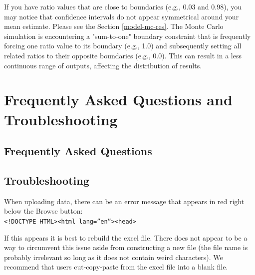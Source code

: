 \documentclass[
]{book}
\begin{document}
If you have ratio values that are close to boundaries (e.g., 0.03 and 0.98), you may notice that confidence intervals do not appear symmetrical around your mean estimate. Please see the Section \ref{model-mc-res}. The Monte Carlo simulation is encountering a "sum-to-one" boundary constraint that is frequently forcing one ratio value to its boundary (e.g., 1.0) and subsequently setting all related ratios to their opposite boundaries (e.g., 0.0). This can result in a less continuous range of outputs, affecting the distribution of results.

\hypertarget{ft}{%
\chapter{Frequently Asked Questions and Troubleshooting}\label{ft}}

\hypertarget{ft-faqs}{%
\section{Frequently Asked Questions}\label{ft-faqs}}

\hypertarget{ft-trbl}{%
\section{Troubleshooting}\label{ft-trbl}}

When uploading data, there can be an error message that appears in red right below the Browse button:\\
\texttt{\textless{}!DOCTYPE\ HTML\textgreater{}\textless{}html\ lang=”en”\textgreater{}\textless{}head\textgreater{}}

If this appears it is best to rebuild the excel file. There does not appear to be a way to circumvent this issue aside from constructing a new file (the file name is probably irrelevant so long as it does not contain weird characters). We recommend that users cut-copy-paste from the excel file into a blank file.

  
\end{document}

